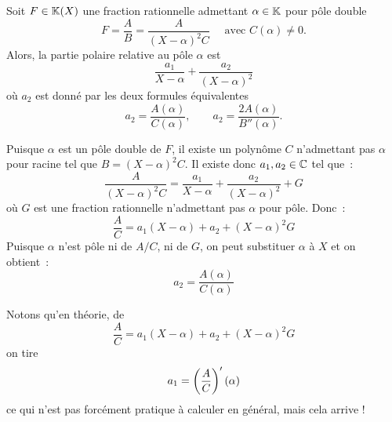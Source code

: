 \documentclass{magnolia}
\begin{document}

\begin{proposition}
Soit $F\in\fracK$ une fraction rationnelle admettant $\alpha\in\mathbb{K}$ pour pôle double
\[F=\frac{A}{B}=\frac{A}{(X-\alpha)^2C} \quad \text{ avec } C(\alpha)\neq 0. \]
Alors, la partie polaire relative au pôle $\alpha$ est
\[\frac{a_1}{X-\alpha}+\frac{a_2}{(X-\alpha)^2}\]
où $a_2$ est donné par les deux formules équivalentes
\[a_2=\frac{A(\alpha)}{C(\alpha)}, \qquad a_2=\frac{2 A(\alpha)}{B''(\alpha)}.\]
\end{proposition}

\begin{preuve}
Puisque $\alpha$ est un pôle double de $F$, il existe un polynôme $C$
 n'admettant pas $\alpha$ pour racine tel que $B=(X-\alpha)^2 C$.
 Il existe donc $a_1,a_2\in\mathbb{C}$ tel que~:
 $$\frac{A}{(X-\alpha)^2C}=\frac{a_1}{X-\alpha}+\frac{a_2}{(X-\alpha)^2}+G$$
 où $G$ est une fraction rationnelle n'admettant pas $\alpha$ pour pôle. Donc~:
 $$\frac{A}{C}=a_1(X-\alpha)+a_2+(X-\alpha)^2 G$$
 Puisque $\alpha$ n'est pôle ni de $A/C$, ni de $G$, on peut substituer $\alpha$
 à $X$ et on obtient~:
 $$a_2=\frac{A(\alpha)}{C(\alpha)}$$
 \end{preuve}
 
 \begin{sol}
 Notons qu'en théorie, de $$\frac{A}{C}=a_1(X-\alpha)+a_2+(X-\alpha)^2 G$$ on tire $$a_1=\left(\frac{A}{C}\right)'(\alpha)$$ ce qui n'est pas forcément pratique à calculer en général, mais cela arrive !
 \end{sol}
\end{document}
